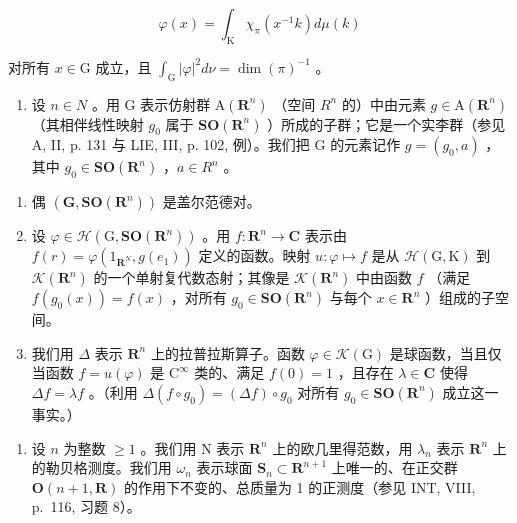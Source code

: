 \[
\varphi (x) = \int_ {\mathrm{K}} \chi_ {\pi} (x ^ {- 1} k) d \mu (k)
\]

对所有 \(x \in \mathrm{G}\) 成立，且 \(\int_{\mathrm{G}} |\varphi|^2 d\nu = \dim(\pi)^{-1}\) 。

\begin{enumerate}
\def\labelenumi{\arabic{enumi})}
\setcounter{enumi}{29}
\tightlist
\item
  设 \(n \in N\) 。用 G 表示仿射群 \(\mathrm{A}(\mathbf{R}^{n})\) （空间 \(R^{n}\) 的）中由元素 \(g \in \mathrm{A}(\mathbf{R}^{n})\) （其相伴线性映射 \(g_{0}\) 属于 \(\mathbf{SO}(\mathbf{R}^{n})\) ）所成的子群；它是一个实李群（参见 A, II, p. 131 与 LIE, III, p. 102, 例）。我们把 G 的元素记作 \(g = (g_{0}, a)\) ，其中 \(g_{0} \in \mathbf{SO}(\mathbf{R}^{n})\) ，\(a \in R^{n}\) 。
\end{enumerate}

\begin{enumerate}
\def\labelenumi{\alph{enumi})}
\item
  偶 \((\mathbf{G},\mathbf{SO}(\mathbf{R}^n))\) 是盖尔范德对。
\item
  设 \(\varphi \in \mathcal{H}(\mathrm{G},\mathbf{SO}(\mathbf{R}^n))\) 。用 \(f\colon \mathbf{R}^n\to \mathbf{C}\) 表示由 \(f(r) = \varphi (1_{\mathbf{R}^N},g(e_1))\) 定义的函数。映射 \(u\colon \varphi \mapsto f\) 是从 \(\mathcal{H}(\mathrm{G},\mathrm{K})\) 到 \(\mathcal{K}(\mathbf{R}^n)\) 的一个单射复代数态射；其像是 \(\mathcal{K}(\mathbf{R}^n)\) 中由函数 \(f\) （满足 \(f(g_0(x)) = f(x)\) ，对所有 \(g_0\in \mathbf{SO}(\mathbf{R}^n)\) 与每个 \(x\in \mathbf{R}^n\) ）组成的子空间。
\item
  我们用 \(\Delta\) 表示 \(\mathbf{R}^n\) 上的拉普拉斯算子。函数 \(\varphi \in \mathcal{K}(\mathrm{G})\) 是球函数，当且仅当函数 \(f = u(\varphi)\) 是 \(\mathrm{C}^{\infty}\) 类的、满足 \(f(0) = 1\) ，且存在 \(\lambda \in \mathbf{C}\) 使得 \(\Delta f = \lambda f\) 。（利用 \(\Delta(f \circ g_0) = (\Delta f) \circ g_0\) 对所有 \(g_0 \in \mathbf{SO}(\mathbf{R}^n)\) 成立这一事实。）
\end{enumerate}

\begin{enumerate}
\def\labelenumi{\arabic{enumi})}
\setcounter{enumi}{30}
\tightlist
\item
  设 \(n\) 为整数 \(\geqslant 1\) 。我们用 N 表示 \(\mathbf{R}^n\) 上的欧几里得范数，用 \(\lambda_n\) 表示 \(\mathbf{R}^n\) 上的勒贝格测度。我们用 \(\omega_n\) 表示球面 \(\mathbf{S}_n \subset \mathbf{R}^{n+1}\) 上唯一的、在正交群 \(\mathbf{O}(n+1, \mathbf{R})\) 的作用下不变的、总质量为 1 的正测度（参见 INT, VIII, p.~116, 习题 8）。
\end{enumerate}

